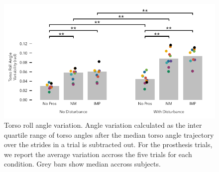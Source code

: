 \begin{figure}[h]
    \centering 
    \includegraphics[width=\textwidth]{treadmill_vib_torso_var_y}
    \caption{Torso roll angle variation. Angle variation calculated as the inter
    quartile range of torso angles after the median torso angle trajectory over
    the strides in a trial is subtracted out. For the prosthesis trials, we
    report the average variation accross the five trials for each condition.
    Grey bars show median accross subjects.}\label{fig:treadmill_exp_falls}
\end{figure}

